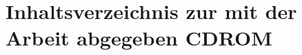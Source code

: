 \documentclass[12pt, a4paper]{report}
\begin{document}
	
	\chapter{Inhaltsverzeichnis zur mit der Arbeit abgegeben CDROM}
	
	
	
	
	
	
	
	
	
	
\end{document}
